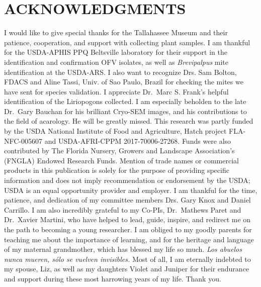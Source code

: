 \documentclass{ufdissertation}[overrideChapters] %
\begin{document}

{\hypertarget{acknowledgments}{%
\chapter{ACKNOWLEDGMENTS}\label{acknowledgments}}

I would like to give special thanks for the Tallahassee Museum and their patience, cooperation, and support with collecting plant samples. I am thankful for the USDA-APHIS PPQ Beltsville laboratory for their support in the identification and confirmation OFV isolates, as well as \emph{Brevipalpus} mite identification at the USDA-ARS. I also want to recognize Drs. Sam Bolton, FDACS and Aline Tassi, Univ. of Sao Paulo, Brazil for checking the mites we have sent for species validation. I appreciate Dr.~Marc S. Frank's helpful identification of the Liriopogons collected. I am especially beholden to the late Dr.~Gary Bauchan for his brilliant Cryo-SEM images, and his contributions to the field of acarology. He will be greatly missed. This research was partly funded by the USDA National Institute of Food and Agriculture, Hatch project FLA-NFC-005607 and USDA-AFRI-CPPM 2017-70006-27268. Funds were also contributed by The Florida Nursery, Growers and Landscape Association's (FNGLA) Endowed Research Funds. Mention of trade names or commercial products in this publication is solely for the purpose of providing specific information and does not imply recommendation or endorsement by the USDA; USDA is an equal opportunity provider and employer. I am thankful for the time, patience, and dedication of my committee members Drs. Gary Knox and Daniel Carrillo. I am also incredibly grateful to my Co-PIs, Dr.~Mathews Paret and Dr.~Xavier Martini, who have helped to lead, guide, inspire, and redirect me on the path to becoming a young researcher. I am obliged to my goodly parents for teaching me about the importance of learning, and for the heritage and language of my maternal grandmother, which has blessed my life so much. \emph{Los abuelos nunca mueren, sólo se vuelven invisibles.} Most of all, I am eternally indebted to my spouse, Liz, as well as my daughters Violet and Juniper for their endurance and support during these most harrowing years of my life. Thank you.}              %


\end{document}
